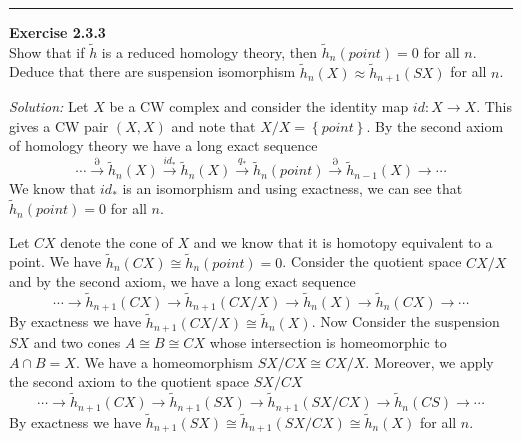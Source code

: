 \documentclass[a4paper, 12pt]{article}
\newenvironment{problem}[2][Exercise]
    { \begin{mdframed}[backgroundcolor=gray!20] \textbf{#1 #2} \\}
    {  \end{mdframed}}
\newenvironment{solution}
    {\textit{Solution:}}
    {}
\begin{document}
\noindent\rule{7in}{2.8pt}
\begin{problem}{2.3.3}
Show that if \(\tilde{h}\) is a reduced homology theory, then \(\tilde{h}_n(point)=0\) for all \(n\). Deduce that there are suspension isomorphism \(\tilde{h}_n(X)\approx \tilde{h}_{n+1}(SX)\) for all \(n\).
\end{problem}
\begin{solution}
Let \(X\) be a CW complex and consider the identity map \(id:X\rightarrow X\). This gives a CW pair \((X,X)\) and note that \(X/X=\left\{ point \right\}\). By the second axiom of homology theory we have a long exact sequence 
\[\cdots\xrightarrow{\partial}\tilde{h}_n(X)\xrightarrow{id_*}\tilde{h}_n(X)\xrightarrow{q_*}\tilde{h}_n(point)\xrightarrow{\partial}\tilde{h}_{n-1}(X)\rightarrow \cdots\]
We know that \(id_*\) is an isomorphism and using exactness, we can see that \(\tilde{h}_n(point)=0\) for all \(n\). 

Let \(CX\) denote the cone of \(X\) and we know that it is homotopy equivalent to a point. We have \(\tilde{h}_n(CX)\cong \tilde{h}_n(point)=0\). Consider the quotient space \(CX/X\) and by the second axiom, we have a long exact sequence 
\[\cdots\rightarrow \tilde{h}_{n+1}(CX)\rightarrow \tilde{h}_{n+1}(CX/X)\rightarrow \tilde{h}_n(X)\rightarrow \tilde{h}_n(CX)\rightarrow \cdots\]
By exactness we have \(\tilde{h}_{n+1}(CX/X)\cong \tilde{h}_n(X)\). Now Consider the suspension \(SX\) and two cones \(A\cong B\cong CX\) whose intersection is homeomorphic to \(A\cap B=X\). We have a homeomorphism \(SX/CX\cong CX/X\). Moreover, we apply the second 
axiom to the quotient space \(SX/CX\)
\[\cdots\rightarrow \tilde{h}_{n+1}(CX)\rightarrow \tilde{h}_{n+1}(SX)\rightarrow \tilde{h}_{n+1}(SX/CX)\rightarrow \tilde{h}_n(CS)\rightarrow \cdots\]
By exactness we have 
\(\tilde{h}_{n+1}(SX)\cong \tilde{h}_{n+1}(SX/CX)\cong \tilde{h}_n(X)\) for all \(n\).
\end{solution}
\end{document}
